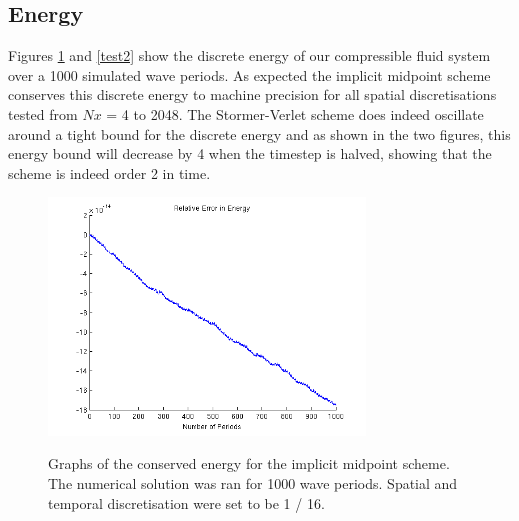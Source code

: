 \documentclass[a4paper,11pt]{article}
\begin{document}
\subsection{Energy}

Figures \ref{test} and \ref{test2} show the discrete energy of our compressible fluid system over a 1000 simulated wave periods. As expected the implicit midpoint scheme conserves this discrete energy to machine precision for all spatial discretisations tested from $Nx$ = 4 to 2048.  The Stormer-Verlet scheme does indeed oscillate around a tight bound for the discrete energy and as shown in the two figures, this energy bound will decrease by 4 when the timestep is halved, showing that the scheme is indeed order 2 in time. 
\begin{figure}
    \centering
    \includegraphics[width=0.75\textwidth]{error1.png}
    \label{test}
    \caption{Graphs of the conserved energy for the implicit midpoint scheme. The numerical solution was ran for 1000 wave periods. Spatial and temporal  discretisation were set to be 1 / 16. }
\end{figure}
\end{document}
